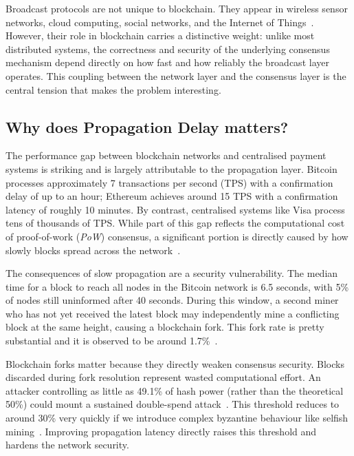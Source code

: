 \documentclass{article}
\begin{document}
Broadcast protocols are not unique to blockchain. They appear in wireless sensor networks, cloud computing, social networks, and the Internet of Things~\cite{laiAcceleratingBlockTransaction2025}. However, their role in blockchain carries a distinctive weight: unlike most distributed systems, the correctness and security of the underlying consensus mechanism depend directly on how fast and how reliably the broadcast layer operates\cite{eyalMajorityNotEnough2013, deckerInformationPropagationBitcoin2013}. This coupling between the network layer and the consensus layer is the central tension that makes the problem interesting.


\subsection{Why does Propagation Delay matters?}
The performance gap between blockchain networks and centralised payment systems is striking and is largely attributable to the propagation layer. Bitcoin processes approximately 7 transactions per second (TPS) with a confirmation delay of up to an hour; Ethereum achieves around 15 TPS with a confirmation latency of roughly 10 minutes. By contrast, centralised systems like Visa process tens of thousands of TPS\cite{liScalableMultiLayerPBFT2021}. While part of this gap reflects the computational cost of proof-of-work (\textit{PoW}) consensus, a significant portion is directly caused by how slowly blocks spread across the network~\cite{deckerInformationPropagationBitcoin2013}.

The consequences of slow propagation are a security vulnerability. The median time for a block to reach all nodes in the Bitcoin network is 6.5 seconds, with 5\% of nodes still uninformed after 40 seconds. During this window, a second miner who has not yet received the latest block may independently mine a conflicting block at the same height, causing a blockchain fork. This fork rate is pretty substantial and it is observed to be around 1.7\%~\cite{deckerInformationPropagationBitcoin2013}.

Blockchain forks matter because they directly weaken consensus security. Blocks discarded during fork resolution represent wasted computational effort. An attacker controlling as little as 49.1\% of hash power (rather than the theoretical 50\%) could mount a sustained double-spend attack~\cite{deckerInformationPropagationBitcoin2013}. This threshold reduces to around 30\% very quickly if we introduce complex byzantine behaviour like selfish mining~\cite{eyalMajorityNotEnough2013}. Improving propagation latency directly raises this threshold and hardens the network security.
\end{document}
